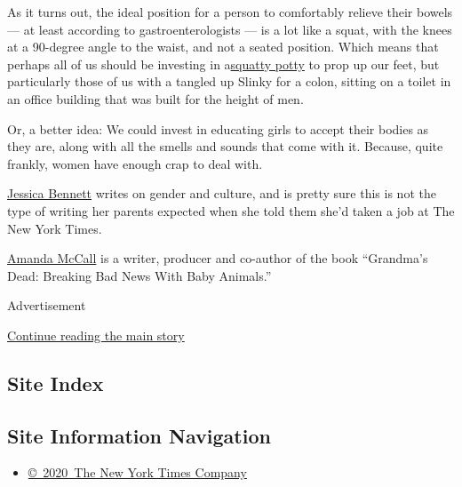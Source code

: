 As it turns out, the ideal position for a person to comfortably relieve
their bowels --- at least according to gastroenterologists --- is a lot
like a squat, with the knees at a 90-degree angle to the waist, and not
a seated position. Which means that perhaps all of us should be
investing in
a\href{https://www.theguardian.com/news/2018/nov/30/bowel-movement-change-the-way-you-poo-squatty-potty-toilet?CMP=Share_iOSApp_Other}{squatty
potty} to prop up our feet, but particularly those of us with a tangled
up Slinky for a colon, sitting on a toilet in an office building that
was built for the height of men.

Or, a better idea: We could invest in educating girls to accept their
bodies as they are, along with all the smells and sounds that come with
it. Because, quite frankly, women have enough crap to deal with.

\href{http://jessicabennett.com/}{Jessica Bennett} writes on gender and
culture, and is pretty sure this is not the type of writing her parents
expected when she told them she'd taken a job at The New York Times.

\href{https://amandacmccall.com/}{Amanda McCall} is a writer, producer
and co-author of the book ``Grandma's Dead: Breaking Bad News With Baby
Animals.''

Advertisement

\protect\hyperlink{after-bottom}{Continue reading the main story}

\hypertarget{site-index}{%
\subsection{Site Index}\label{site-index}}

\hypertarget{site-information-navigation}{%
\subsection{Site Information
Navigation}\label{site-information-navigation}}

\begin{itemize}
\tightlist
\item
  \href{https://help.nytimes3xbfgragh.onion/hc/en-us/articles/115014792127-Copyright-notice}{©~2020~The
  New York Times Company}
\end{itemize}

